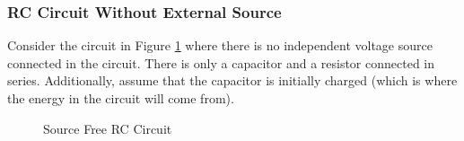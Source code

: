 \documentclass[12pt]{article}
\begin{document}
\subsubsection{RC Circuit Without External Source}
\label{sssec:rcCircuitWithoutExternalSource}

Consider the circuit in Figure \ref{fig:025} where there is no independent voltage source connected in the circuit. There is only a capacitor and a resistor connected in series. Additionally, assume that the capacitor is initially charged (which is where the energy in the circuit will come from).

\begin{figure}[H]
  \centering
  
  \caption{Source Free RC Circuit}
  \label{fig:025}
\end{figure}
\end{document}
